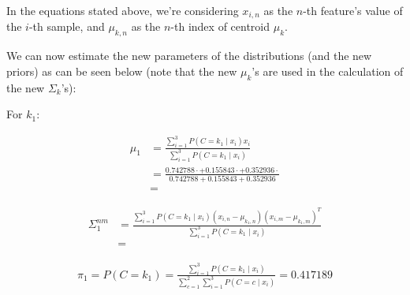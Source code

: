 \documentclass[12pt]{article}
\begin{document}
\begin{enumerate}[leftmargin=\labelsep]
\begin{itemize}[leftmargin=]
                In the equations stated above, we're considering $x_{i, n}$ as the $n$-th
                feature's value of the $i$-th sample, and $\mu_{k, n}$ as the $n$-th
                index of centroid $\mu_k$.

                \pagebreak

                We can now estimate the new parameters of the distributions (and the new
                priors) as can be seen below (note that the new $\mu_k$'s are used
                in the calculation of the new $\Sigma_k$'s):


                For $k_1$:

                \begin{equation*}
                  \begin{aligned}
                    \mu_1 & = \frac{\sum_{i=1}^3 P(C = k_1 \mid x_i) x_i}{\sum_{i=1}^3 P(C = k_1 \mid x_i)}                                                                                      \\
                          & = \frac{0.742788 \cdot  + 0.155843 \cdot  + 0.352936 \cdot }{0.742788 + 0.155843 + 0.352936} \\
                          & = 
                  \end{aligned}
                \end{equation*}

                \begin{equation*}
                  \begin{aligned}
                    \Sigma_1^{nm} & = \frac{\sum_{i=1}^3 P(C = k_1 \mid x_i) (x_{i, n} - \mu_{k_1, n}) (x_{i, m} - \mu_{k_1, m})^T}{\sum_{i=1}^3 P(C = k_1 \mid x_i)} \\
                                  & = 
                  \end{aligned}
                \end{equation*}

                \begin{equation*}
                  \begin{aligned}
                    \pi_1 = P(C = k_1) = \frac{\sum_{i=1}^3 P(C = k_1 \mid x_i)}{\sum_{c=1}^2\sum_{i=1}^3 P(C = c \mid x_i)} = 0.417189
                  \end{aligned}
                \end{equation*}


\end{itemize}
\end{enumerate}
\end{document}

